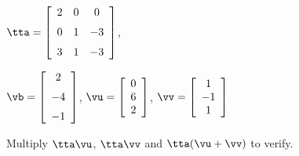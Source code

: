 {$\tta = \left[ \begin {array}{ccc} 2 & 0 & 0 \\ \noalign{\medskip} 0&1&-3\\ \noalign{\medskip} 3&1&-3 \end {array} \right] $, 

$\vb=\left[ \begin {array}{c} 2\\ \noalign{\medskip} -4 \\ \noalign{\medskip} -1 \end {array} \right] $, 
$\vu = \left[ \begin {array}{c} 0 \\ 6 \\ 2  \end{array} \right]$, 
$\vv = \left[ \begin{array}{c} 1\\ -1 \\ 1  \end{array} \right] $}
{Multiply $\tta\vu$, $\tta\vv$ and $\tta(\vu+\vv)$ to verify.}
